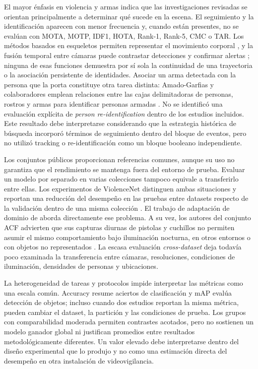 \documentclass[pdflatex,sn-mathphys-num]{sn-jnl}%
\theoremstyle{thmstyleone}%
\theoremstyle{thmstyletwo}%
\theoremstyle{thmstylethree}%
\begin{document}
El mayor énfasis en violencia y armas indica que las investigaciones revisadas se orientan principalmente a determinar qué sucede en la escena. El seguimiento y la identificación aparecen con menor frecuencia y, cuando están presentes, no se evalúan con MOTA, MOTP, IDF1, HOTA, Rank-1, Rank-5, CMC o TAR. Los métodos basados en esqueletos permiten representar el movimiento corporal \cite{garciacobo2023}, y la fusión temporal entre cámaras puede contrastar detecciones y confirmar alertas \cite{fierrosilva2026}; ninguna de esas funciones demuestra por sí sola la continuidad de una trayectoria o la asociación persistente de identidades. Asociar un arma detectada con la persona que la porta constituye otra tarea distinta: Amado-Garfias y colaboradores emplean relaciones entre las cajas delimitadoras de personas, rostros y armas para identificar personas armadas \cite{amado2024}. No se identificó una evaluación explícita de \textit{person re-identification} dentro de los estudios incluidos. Este resultado debe interpretarse considerando que la estrategia histórica de búsqueda incorporó términos de seguimiento dentro del bloque de eventos, pero no utilizó tracking o re-identificación como un bloque booleano independiente.

Los conjuntos públicos proporcionan referencias comunes, aunque su uso no garantiza que el rendimiento se mantenga fuera del entorno de prueba. Evaluar un modelo por separado en varias colecciones tampoco equivale a transferirlo entre ellas. Los experimentos de ViolenceNet distinguen ambas situaciones y reportan una reducción del desempeño en las pruebas entre datasets respecto de la validación dentro de una misma colección \cite{rendon2021}. El trabajo de adaptación de dominio de \citet{ciampi2024} aborda directamente ese problema. A su vez, los autores del conjunto ACF advierten que sus capturas diurnas de pistolas y cuchillos no permiten asumir el mismo comportamiento bajo iluminación nocturna, en otros entornos o con objetos no representados \cite{hnoohom2022}. La escasa evaluación \textit{cross-dataset} deja todavía poco examinada la transferencia entre cámaras, resoluciones, condiciones de iluminación, densidades de personas y ubicaciones.

La heterogeneidad de tareas y protocolos impide interpretar las métricas como una escala común. Accuracy resume aciertos de clasificación y mAP evalúa detección de objetos; incluso cuando dos estudios reportan la misma métrica, pueden cambiar el dataset, la partición y las condiciones de prueba. Los grupos con comparabilidad moderada permiten contrastes acotados, pero no sostienen un modelo ganador global ni justifican promedios entre resultados metodológicamente diferentes. Un valor elevado debe interpretarse dentro del diseño experimental que lo produjo y no como una estimación directa del desempeño en otra instalación de videovigilancia.
\end{document}
